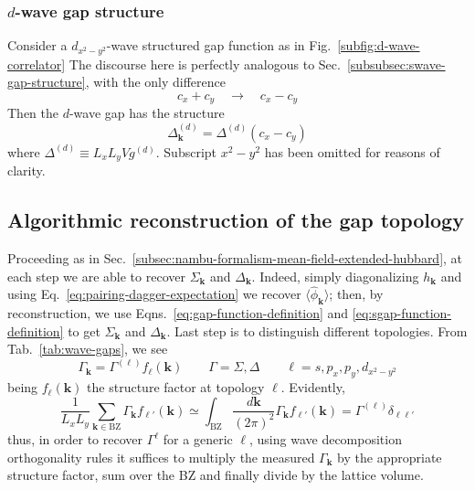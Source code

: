 \subsubsection{$d$-wave gap structure}

Consider a $d_{x^2 - y^2}$-wave structured gap function as in Fig.~\ref{subfig:d-wave-correlator} The discourse here is perfectly analogous to Sec.~\ref{subsubsec:swave-gap-structure}, with the only difference
\[
	c_x + c_y
	\quad\to\quad
	c_x - c_y
\]
Then the $d$-wave gap has the structure
\begin{equation}\label{eq:dwave-gap}
	\Delta_\mathbf{k}^{(d)} = \Delta^{(d)} (c_x - c_y)
\end{equation}
where $\Delta^{(d)} \equiv L_x L_y V g^{(d)}$. Subscript $x^2 - y^2$ has been omitted for reasons of clarity.

\subsection{Algorithmic reconstruction of the gap topology}

Proceeding as in Sec.~\ref{subsec:nambu-formalism-mean-field-extended-hubbard}, at each step we are able to recover $\Sigma_\mathbf{k}$ and $\Delta_\mathbf{k}$. Indeed, simply diagonalizing $h_\mathbf{k}$ and using Eq.~\eqref{eq:pairing-dagger-expectation} we recover $\langle \hat \phi_\mathbf{k} \rangle$; then, by reconstruction, we use Eqns.~\eqref{eq:gap-function-definition} and \eqref{eq:sgap-function-definition} to get $\Sigma_\mathbf{k}$ and $\Delta_\mathbf{k}$. Last step is to distinguish different topologies. From Tab.~\ref{tab:wave-gaps}, we see
\[
	\Gamma_\mathbf{k} = \Gamma^{(\ell)} f_\ell (\mathbf{k})
	\qquad
	\Gamma = \Sigma, \Delta
	\qquad
	\ell = s,p_x,p_y,d_{x^2-y^2}
\]
being $f_\ell(\mathbf{k})$ the structure factor at topology $\ell$. Evidently,
\[
	\frac{1}{L_x L_y} \sum_{\mathbf{k} \in \mathrm{BZ}} \Gamma_\mathbf{k} f_{\ell'} (\mathbf{k}) \simeq \int_\mathrm{BZ} \frac{d\mathbf{k}}{(2\pi)^2} \Gamma_\mathbf{k} f_{\ell'} (\mathbf{k}) = \Gamma^{(\ell)} \delta_{\ell\ell'}
\]
thus, in order to recover $\Gamma^{\ell}$ for a generic $\ell$, using wave decomposition orthogonality rules it suffices to multiply the measured $\Gamma_\mathbf{k}$ by the appropriate structure factor, sum over the BZ and finally divide by the lattice volume.